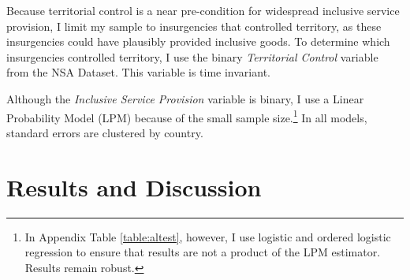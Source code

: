 \documentclass[12pt, letterpaper]{article}
\begin{document}
Because territorial control is a near pre-condition for widespread inclusive service provision, I limit my sample to insurgencies that controlled territory, as these insurgencies could have plausibly provided inclusive goods. To determine which insurgencies controlled territory, I use the binary \textit{Territorial Control} variable from the NSA Dataset. This variable is time invariant.

Although the \textit{Inclusive Service Provision} variable is binary, I use a Linear Probability Model (LPM) because of the small sample size.\footnote{In Appendix Table \autoref{table:altest}, however, I use logistic and ordered logistic regression to ensure that results are not a product of the LPM estimator. Results remain robust.} In all models, standard errors are clustered by country. %





\section*{Results and Discussion}
\end{document}
